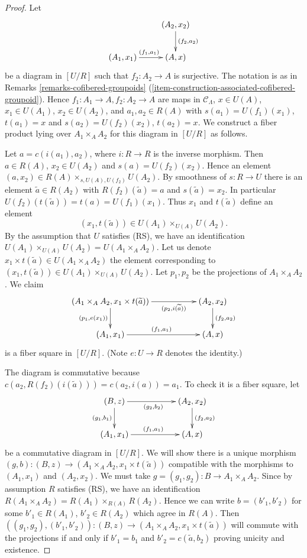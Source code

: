 \documentclass{amsart}
\theoremstyle{plain}
\theoremstyle{definition}
\theoremstyle{remark}
\numberwithin{equation}{subsection}
\begin{document}
\begin{proof}
Let
$$
\xymatrix{
                           &     (A_2, x_2) \ar[d]^{(f_2, a_2)} \\
(A_1, x_1) \ar[r]^{(f_1, a_1)} &     (A, x)
}
$$
be a diagram in $[U/R]$ such that $f_2: A_2 \to A$ is surjective. The
notation is as in
Remarks \ref{remarks-cofibered-groupoids}
(\ref{item-construction-associated-cofibered-groupoid}).
Hence $f_1: A_1 \to A, f_2: A_2 \to A$ are maps in
$\mathcal{C}_\Lambda$, $x \in U(A)$, $x_1 \in U(A_1)$, $x_2 \in U(A_2)$,
and $a_1, a_2 \in R(A)$ with $s(a_1) = U(f_1)(x_1)$,
$t(a_1) = x$ and $s(a_2) = U(f_2)(x_2)$, $t(a_2) = x$.
We construct a fiber product lying over $A_1 \times_A A_2$
for this diagram in $[U/R]$ as follows.

\medskip\noindent
Let $a = c(i(a_1), a_2)$, where $i: R \to R$ is the inverse morphism.
Then $a \in R(A)$, $x_2 \in U(A_2)$ and $s(a) = U(f_2)(x_2)$.
Hence an element $(a, x_2) \in R(A) \times_{s, U(A), U(f_2)} U(A_2)$.
By smoothness of $s : R \to U$ there is an element
$\widetilde{a} \in R(A_2)$ with $R(f_2)(\widetilde{a}) = a$ and
$s(\widetilde{a}) = x_2$. In particular
$U(f_2)(t(\widetilde{a})) = t(a) = U(f_1)(x_1)$. Thus $x_1$ and
$t(\widetilde{a})$ define an element
$$
(x_1, t(\widetilde{a})) \in U(A_1) \times_{U(A)} U(A_2).
$$
By the assumption that $U$ satisfies (RS), we have an identification
$U(A_1) \times_{U(A)} U(A_2) = U(A_1 \times_A A_2)$. Let us denote
$x_1 \times t(\widetilde{a}) \in U(A_1 \times_A A_2)$ the element
corresponding to $(x_1, t(\widetilde{a})) \in U(A_1) \times_{U(A)} U(A_2)$.
Let $p_1, p_2$ be the projections of $A_1 \times_A A_2$.  We claim
$$
\xymatrix{
(A_1 \times_A A_2, x_1 \times t(\widetilde{a})) \ar[d]_{(p_1, e(x_1))}
\ar[rr]_-{(p_2, i(\widetilde{a}))} & & (A_2, x_2) \ar[d]^{(f_2, a_2)} \\
(A_1, x_1) \ar[rr]^{(f_1, a_1)} & & (A, x)
}
$$
is a fiber square in $[U/R]$. (Note $e: U \to R$ denotes the identity.)

\medskip\noindent
The diagram is commutative because
$c(a_2, R(f_2)(i(\widetilde{a}))) = c(a_2, i(a)) = a_1$.
To check it is a fiber square, let
$$
\xymatrix{
(B, z) \ar[d]_{(g_1, b_1)} \ar[rr]_{(g_2, b_2)} & & (A_2, x_2)
\ar[d]^{(f_2, a_2)} \\
(A_1, x_1) \ar[rr]^{(f_1, a_1)} & & (A, x)
}
$$
be a commutative diagram in $[U/R]$. We will show there is a unique morphism
$(g, b) : (B, z) \to (A_1 \times_A A_2, x_1 \times t(\widetilde{a}))$
compatible with the morphisms to $(A_1, x_1)$ and $(A_2, x_2)$.
We must take $g = (g_1, g_2) : B \to A_1 \times_A A_2$.
Since by assumption $R$ satisfies (RS), we have an identification
$R(A_1 \times_A A_2) = R(A_1) \times_{R(A)} R(A_2)$.
Hence we can write $b = (b'_1, b'_2)$ for some
$b'_1 \in R(A_1)$, $b'_2 \in R(A_2)$ which agree in $R(A)$.
Then
$((g_1, g_2), (b'_1, b'_2)) : (B, z) \to
(A_1 \times_A A_2, x_1 \times t(\widetilde{a}))$
will commute with the projections if and only if
$b'_1 = b_1$ and $b'_2 = c(\widetilde{a}, b_2)$ proving unicity and
existence.
\end{proof}
\end{document}
